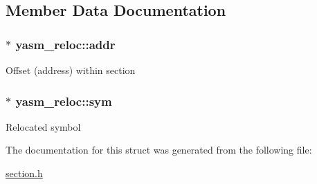 \subsection{Member Data Documentation}
\hypertarget{structyasm__reloc_a9db8b634bcb8ec710a5c30059144bdcf}{
\subsubsection[{addr}]{$\ast$ yasm\-\_\-reloc\-::addr}}\label{structyasm__reloc_a9db8b634bcb8ec710a5c30059144bdcf}
Offset (address) within section \hypertarget{structyasm__reloc_aa8dbe555efda37f9226784a32b389807}{
\subsubsection[{sym}]{$\ast$ yasm\-\_\-reloc\-::sym}}\label{structyasm__reloc_aa8dbe555efda37f9226784a32b389807}
Relocated symbol 

The documentation for this struct was generated from the following file\-:\begin{DoxyCompactItemize}
\item 
\hyperlink{section_8h}{section.\-h}\end{DoxyCompactItemize}

